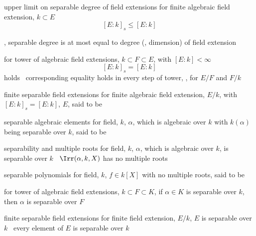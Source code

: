\documentclass[17pt,landscape]{foils}
\begin{document}
{\begin{mytheorem}{upper limit on separable degree of field extensions}
	for finite algebraic field extension, $k\subset E$
	$$
		[E:k]_s \leq [E:k]
	$$
\end{mytheorem}

\bit
\item
	\ie, separable degree is at most equal to degree (\ie, dimension) of field extension
\eit

\begin{mycorollary}{}
	for tower of algebraic field extensions, $k\subset F\subset E$,
	with $[E:k]<\infty$\
	$$
		[E:k]_s = [E:k]
	$$
	holds
	\iaoi\
	corresponding equality holds in every step of tower,
	\ie, for $E/F$ and $F/k$
\end{mycorollary}



\begin{mydefinition}{finite separable field extensions}
	for finite algebraic field extension, $E/k$,
	with $[E:k]_s=[E:k]$,
	$E$,
	said to be 
\end{mydefinition}

\begin{mydefinition}{separable algebraic elements}
	for field, $k$,
	$\alpha$, which is algebraic over $k$
	with $k(\alpha)$ being separable over $k$,
	said to be 
\end{mydefinition}

\begin{myproposition}{separability and multiple roots}
	for field, $k$,
	$\alpha$, which is algebraic over $k$,
	is separable over $k$
	\iaoi\
	$\Irr(\alpha,k,X)$
	has no multiple roots
\end{myproposition}

\begin{mydefinition}{separable polynomials}
	for field, $k$,
	$f\in k[X]$ with no multiple roots,
	said to be \define{separable}
\end{mydefinition}

\begin{mylemma}{}
	for tower of algebraic field extensions,
	$k\subset F\subset K$,
	if $\alpha \in K$ is separable over $k$,
	then $\alpha$ is separable over $F$\
\end{mylemma}

\begin{mytheorem}{finite separable field extensions}
	for finite field extension, $E/k$,
	$E$ is separable over $k$
	\iaoi\
	every element of $E$ is separable over $k$
\end{mytheorem}


}
\end{document}
